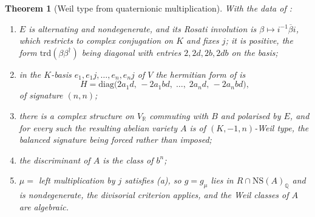 \documentclass[11pt,reqno]{amsart}
\theoremstyle{plain}
\newtheorem{theorem}{Theorem}[section]
\theoremstyle{definition}
\theoremstyle{remark}
\newcommand{\QQ}{\mathbb{Q}}
\newcommand{\RR}{\mathbb{R}}
\newcommand{\NS}{\mathrm{NS}}
\newcommand{\bbar}[1]{\overline{#1}}
\begin{document}
\begin{theorem}[Weil type from quaternionic multiplication]\label{thm:quatweil}
With the data of :
\begin{enumerate}[label=\textup{(\roman*)},nosep]
\item $E$ is alternating and nondegenerate, and its Rosati involution is
  $\beta\mapsto i^{-1}\bbar{\beta}i$, which restricts to complex conjugation on
  $K$ and fixes $j$; it is positive, the form $\mathrm{trd}(\beta\beta^{\dagger})$
  being diagonal with entries $2,2d,2b,2db$ on the basis;
\item in the $K$-basis $e_{1},e_{1}j,\dots,e_{n},e_{n}j$ of $V$ the hermitian
  form of  is
  \[
    H=\mathrm{diag}\bigl(2a_{1}d,\,-2a_{1}bd,\;\dots,\;2a_{n}d,\,-2a_{n}bd\bigr),
  \]
  of signature $(n,n)$;
\item there is a complex structure on $V_{\RR}$ commuting with $B$ and
  polarised by $E$, and for every such the resulting abelian variety $A$ is of
  $(K,-1,n)$-Weil type, the balanced signature being forced rather than
  imposed;
\item the discriminant of $A$ is the class of $b^{n}$;
\item $\mu=$ left multiplication by $j$ satisfies (a),
  so $g=g_{\mu}$ lies in $R\cap\NS(A)_{\QQ}$ and is nondegenerate, the
  divisorial criterion  applies, and the Weil classes
  of $A$ are algebraic.
\end{enumerate}
\end{theorem}
\end{document}
